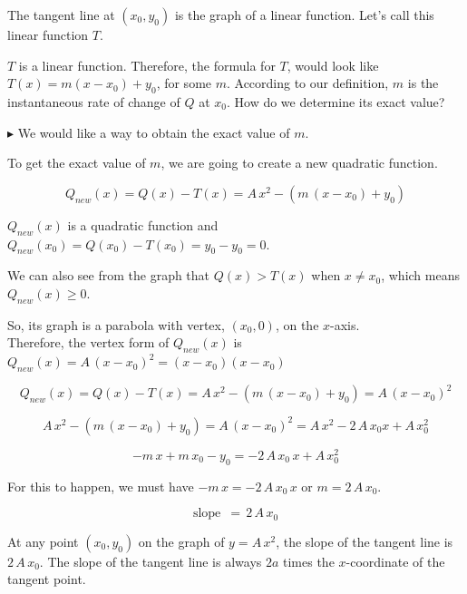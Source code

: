 \documentclass{ximera}
\begin{document}
\begin{explanation}

The tangent line at $(x_0, y_0)$ is the graph of a linear function. Let's call this linear function $T$.


$T$ is a linear function. Therefore, the formula for $T$, would look like $T(x) = m(x - x_0) + y_0$, for some $m$.  According to our definition, $m$ is the instantaneous rate of change of $Q$ at $x_0$.  How do we determine its exact value?


$\blacktriangleright$ We would like a way to obtain the exact value of $m$. 



To get the exact value of $m$, we are going to create a new quadratic function.



\[
Q_{new}(x) = Q(x) - T(x) = A \, x^2 - (m \, (x - x_0) + y_0)
\]



$Q_{new}(x)$ is a quadratic function and $Q_{new}(x_0) = Q(x_0) - T(x_0) = y_0 - y_0 = 0$. 

We can also see from the graph that $Q(x) > T(x)$ when $x \ne x_0$, which means $Q_{new}(x) \geq 0$.


So, its graph is a parabola with vertex, $(x_0, 0)$, on the $x$-axis.  \\


Therefore, the vertex form of $Q_{new}(x)$ is $Q_{new}(x) = A \, (x - x_0)^2 = (x - x_0)(x - x_0)$  






\[
Q_{new}(x) = Q(x) - T(x) = A \, x^2 - (m \, (x - x_0) + y_0) = A \, (x - x_0)^2
\]




\[
A \, x^2 - (m \, (x - x_0) + y_0) = A \, (x - x_0)^2 = A \, x^2 - 2 \, A \, x_0 x + A \, x_0^2
\]



\[
 -m \, x + m \, x_0 - y_0 =   - 2 \, A \, x_0 \, x + A \, x_0^2
\]


For this to happen, we must have $-m \, x = - 2 \, A \, x_0 \, x$ or \textbf{$m = 2 \, A \, x_0$}. 

\[ \text{slope } \, = \, 2 \, A \, x_0  \]

\end{explanation}

At any point $(x_0, y_0)$ on the graph of $y = A \, x^2$, the slope of the tangent line is $2 \, A \, x_0$.  The slope of the tangent line is always $2a$ times the $x$-coordinate of the tangent point.
\end{document}
